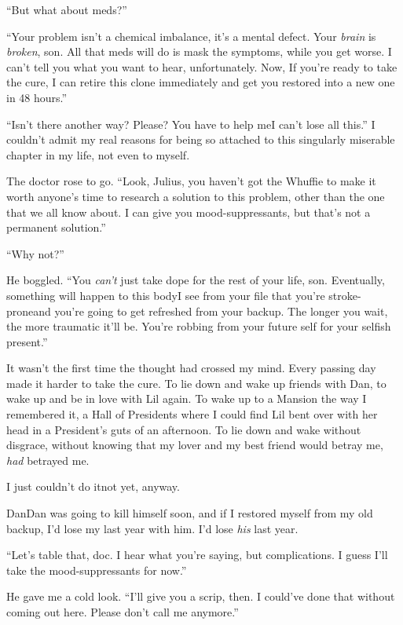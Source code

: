 “But what about meds?”

“Your problem isn't a chemical imbalance, it's a mental defect.
Your \emph{brain} is \emph{broken}, son. All that meds will do is
mask the symptoms, while you get worse. I can't tell you what you
want to hear, unfortunately. Now, If you're ready to take the cure,
I can retire this clone immediately and get you restored into a new
one in 48 hours.”

“Isn't there another way? Please? You have to help me{\dash}I can't lose
all this.” I couldn't admit my real reasons for being so attached
to this singularly miserable chapter in my life, not even to
myself.

The doctor rose to go. “Look, Julius, you haven't got the Whuffie
to make it worth anyone's time to research a solution to this
problem, other than the one that we all know about. I can give you
mood-suppressants, but that's not a permanent solution.”

“Why not?”

He boggled. “You \emph{can't} just take dope for the rest of your
life, son. Eventually, something will happen to this body{\dash}I see
from your file that you're stroke-prone{\dash}and you're going to get
refreshed from your backup. The longer you wait, the more traumatic
it'll be. You're robbing from your future self for your selfish
present.”

It wasn't the first time the thought had crossed my mind. Every
passing day made it harder to take the cure. To lie down and wake
up friends with Dan, to wake up and be in love with Lil again. To
wake up to a Mansion the way I remembered it, a Hall of Presidents
where I could find Lil bent over with her head in a President's
guts of an afternoon. To lie down and wake without disgrace,
without knowing that my lover and my best friend would betray me,
\emph{had} betrayed me.

I just couldn't do it{\dash}not yet, anyway.

Dan{\dash}Dan was going to kill himself soon, and if I restored myself
from my old backup, I'd lose my last year with him. I'd lose
\emph{his} last year.

“Let's table that, doc. I hear what you're saying, but 
complications. I guess I'll take the mood-suppressants for now.”

He gave me a cold look. “I'll give you a scrip, then. I could've
done that without coming out here. Please don't call me anymore.”


